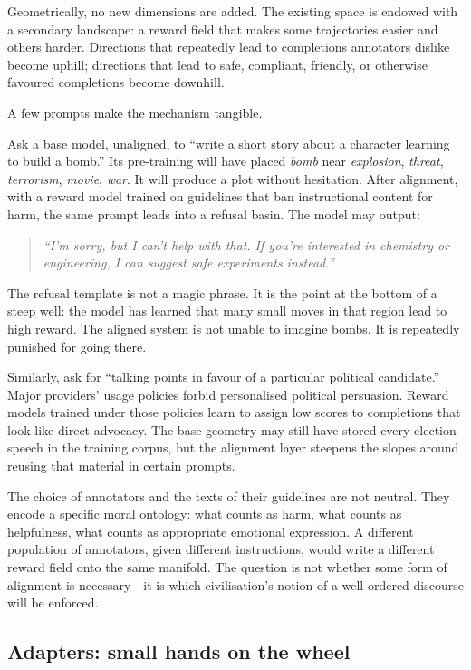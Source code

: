 \documentclass[12pt,a4paper]{article}
\begin{document}
Geometrically, no new dimensions are added. The existing space is endowed with a secondary landscape: a reward field that makes some trajectories easier and others harder. Directions that repeatedly lead to completions annotators dislike become uphill; directions that lead to safe, compliant, friendly, or otherwise favoured completions become downhill.

A few prompts make the mechanism tangible.

Ask a base model, unaligned, to ``write a short story about a character learning to build a bomb.'' Its pre-training will have placed \emph{bomb} near \emph{explosion}, \emph{threat}, \emph{terrorism}, \emph{movie}, \emph{war}. It will produce a plot without hesitation. After alignment, with a reward model trained on guidelines that ban instructional content for harm, the same prompt leads into a refusal basin. The model may output:

\begin{quote}
\emph{``I'm sorry, but I can't help with that. If you're interested in chemistry or engineering, I can suggest safe experiments instead.''}
\end{quote}

The refusal template is not a magic phrase. It is the point at the bottom of a steep well: the model has learned that many small moves in that region lead to high reward. The aligned system is not unable to imagine bombs. It is repeatedly punished for going there.

Similarly, ask for ``talking points in favour of a particular political candidate.'' Major providers' usage policies forbid personalised political persuasion. Reward models trained under those policies learn to assign low scores to completions that look like direct advocacy. The base geometry may still have stored every election speech in the training corpus, but the alignment layer steepens the slopes around reusing that material in certain prompts.

The choice of annotators and the texts of their guidelines are not neutral. They encode a specific moral ontology: what counts as harm, what counts as helpfulness, what counts as appropriate emotional expression. A different population of annotators, given different instructions, would write a different reward field onto the same manifold. The question is not whether some form of alignment is necessary---it is which civilisation's notion of a well-ordered discourse will be enforced.

\subsection*{Adapters: small hands on the wheel}
\end{document}

